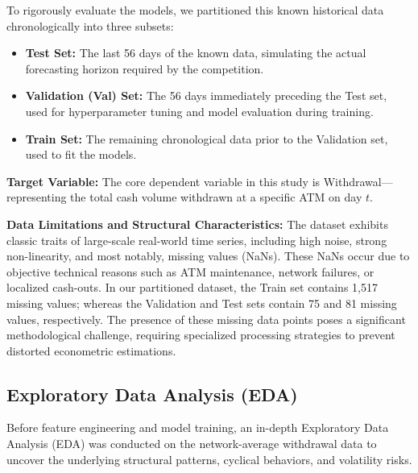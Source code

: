 \documentclass[conference, 12pt, onecolumn]{IEEEtran}
\begin{document}
To rigorously evaluate the models, we partitioned this known historical data chronologically into three subsets:
\begin{itemize}
    \item \textbf{Test Set:} The last 56 days of the known data, simulating the actual forecasting horizon required by the competition.
    \item \textbf{Validation (Val) Set:} The 56 days immediately preceding the Test set, used for hyperparameter tuning and model evaluation during training.
    \item \textbf{Train Set:} The remaining chronological data prior to the Validation set, used to fit the models.
\end{itemize}

\textbf{Target Variable:} The core dependent variable in this study is Withdrawal—representing the total cash volume withdrawn at a specific ATM on day $t$. 

\textbf{Data Limitations and Structural Characteristics:} The dataset exhibits classic traits of large-scale real-world time series, including high noise, strong non-linearity, and most notably, missing values (NaNs). These NaNs occur due to objective technical reasons such as ATM maintenance, network failures, or localized cash-outs. In our partitioned dataset, the Train set contains 1,517 missing values; whereas the Validation and Test sets contain 75 and 81 missing values, respectively. The presence of these missing data points poses a significant methodological challenge, requiring specialized processing strategies to prevent distorted econometric estimations.

\subsection{Exploratory Data Analysis (EDA)}
Before feature engineering and model training, an in-depth Exploratory Data Analysis (EDA) was conducted on the network-average withdrawal data to uncover the underlying structural patterns, cyclical behaviors, and volatility risks. 
\end{document}
